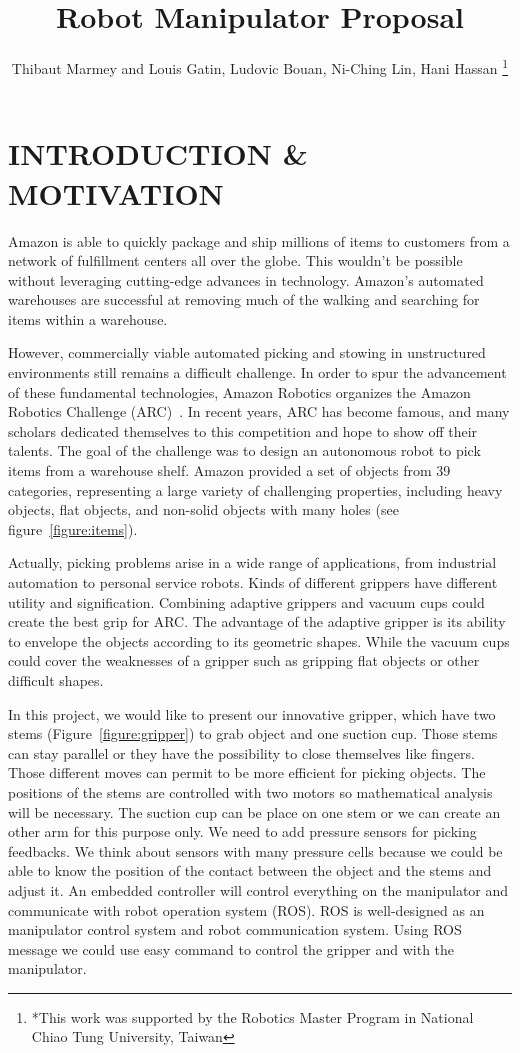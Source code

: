 \documentclass[letterpaper, 10 pt, conference]{ieeeconf}  %
\title{\LARGE \bf
Robot Manipulator Proposal
}
\author{ Thibaut Marmey and Louis Gatin, Ludovic Bouan, Ni-Ching Lin, Hani Hassan  %
\thanks{*This work was supported by the Robotics Master Program in National Chiao Tung University, Taiwan}%
}
\begin{document}
\maketitle
\thispagestyle{empty}
\pagestyle{empty}


\section{INTRODUCTION \& MOTIVATION}

Amazon is able to quickly package and ship millions of items to customers from a network of fulfillment centers all over the globe.
This wouldn't be possible without leveraging cutting-edge advances in technology. Amazon's automated warehouses are successful at removing much of the walking and searching for items within a warehouse.

However, commercially viable automated picking and stowing in unstructured environments still remains a difficult challenge.
In order to spur the advancement of these fundamental technologies, Amazon Robotics organizes the Amazon Robotics Challenge (ARC)~\cite{APC}.
In recent years, ARC has become famous, and many scholars dedicated themselves to this competition and hope to show off their talents. The goal of the challenge was to design an autonomous robot to pick items from a warehouse shelf. Amazon provided a set of objects from 39 categories, representing a large variety of challenging properties, including heavy objects, flat objects, and non-solid objects with many holes (see figure~\ref{figure:items}).

Actually, picking problems arise in a wide range of applications, from industrial automation to personal service robots. Kinds of different grippers have different utility and signification. Combining adaptive grippers and vacuum cups could create the best grip for ARC. The advantage of the adaptive gripper is its ability to envelope the objects according to its geometric shapes. While the vacuum cups could cover the weaknesses of a gripper such as gripping flat objects or other difficult shapes.

In this project, we would like to present our innovative gripper, which have two stems (Figure~\ref{figure:gripper}) to grab object and one suction cup. Those stems can stay parallel or they have the possibility to close themselves like fingers. Those different moves can permit to be more efficient for picking objects. The positions of the stems are controlled with two motors so mathematical analysis will be necessary. The suction cup can be place on one stem or we can create an other arm for this purpose only. We need to add pressure sensors for picking feedbacks. We think about sensors with many pressure cells because we could be able to know the position of the contact between the object and the stems and adjust it. An embedded controller will control everything on the manipulator and communicate with robot operation system (ROS). ROS is well-designed as an manipulator control system and robot communication system. Using ROS message we could use easy command to control the gripper and with the manipulator.
\end{document}
